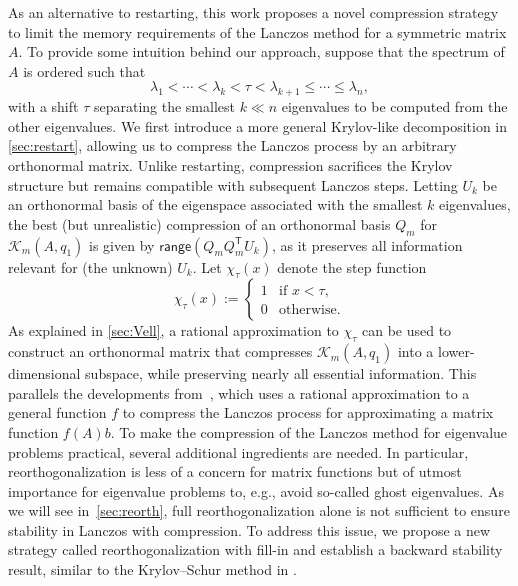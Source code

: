 \documentclass{siamart190516}
\newcommand{\Ttran}{\mathsf{T}}
\newcommand{\range}{\mathsf{range}}
\begin{document}
 
As an alternative to restarting, this work proposes a novel compression strategy to limit the memory requirements of the Lanczos method for a symmetric matrix $A$. To provide some intuition behind our approach, suppose that the spectrum of $A$ is ordered such that
\begin{equation} \label{eq:ordereigenvalues}
\lambda_{1} < \dotsb < \lambda_{k} < \tau < 
\lambda_{k+1} \leq  \dotsb \leq  \lambda_{n},
\end{equation}
with a shift $\tau$ separating the smallest $k \ll n$ eigenvalues to be computed from the other eigenvalues. 
We first introduce a more general Krylov-like decomposition in \cref{sec:restart}, allowing us to compress the Lanczos process by an arbitrary orthonormal matrix.
Unlike restarting, compression sacrifices the Krylov structure but remains compatible with subsequent Lanczos steps.
Letting $U_{k}$ be an orthonormal basis of the eigenspace associated with the smallest $k$ eigenvalues, the best (but unrealistic) compression of an orthonormal basis $Q_{m}$ for $\mathcal{K}_{m}(A,q_{1})$ is given by $\range(Q_{m}Q_{m}^{\Ttran}U_{k})$, as it preserves all information relevant for (the unknown) $U_k$. 
Let $\chi_{\tau}(x)$ denote the step function 
\begin{equation*}
    \chi_{\tau}(x):= \begin{cases}
                  1 & \text{if } x < \tau, \\
                  0 & \text{otherwise.}
                 \end{cases}
\end{equation*}
As explained in \cref{sec:Vell}, a rational approximation to $\chi_{\tau}$ can be used to construct an orthonormal matrix that compresses $\mathcal{K}_{m}(A,q_{1})$ into a lower-dimensional subspace, while preserving nearly all essential information.
This parallels the developments from~\cite{casulli2024low}, which uses a rational approximation to a general function $f$ to compress the Lanczos process for approximating a matrix function $f(A)b$. To make the compression of the Lanczos method for eigenvalue problems practical, several additional ingredients are needed. In particular, reorthogonalization is less of a concern for matrix functions but of utmost importance for eigenvalue problems to, e.g., avoid so-called ghost eigenvalues.
As we will see in~\cref{sec:reorth}, full reorthogonalization alone is not sufficient to ensure stability in Lanczos with compression. To address this issue, we propose a new strategy called reorthogonalization with fill-in and establish a backward stability result, similar to the Krylov--Schur method in \cite{stewart2002krylov}.
\end{document}
